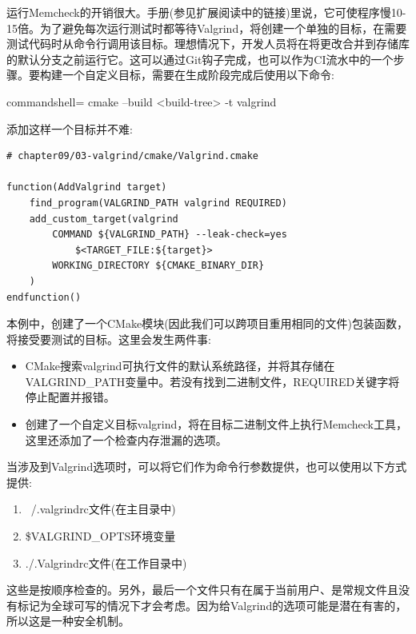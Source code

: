 运行Memcheck的开销很大。手册(参见扩展阅读中的链接)里说，它可使程序慢10-15倍。为了避免每次运行测试时都等待Valgrind，将创建一个单独的目标，在需要测试代码时从命令行调用该目标。理想情况下，开发人员将在将更改合并到存储库的默认分支之前运行它。这可以通过Git钩子完成，也可以作为CI流水中的一个步骤。要构建一个自定义目标，需要在生成阶段完成后使用以下命令:

\begin{tcblisting}{commandshell={}}
cmake --build <build-tree> -t valgrind
\end{tcblisting}

添加这样一个目标并不难:

\begin{lstlisting}[style=styleCMake]
# chapter09/03-valgrind/cmake/Valgrind.cmake

function(AddValgrind target)
	find_program(VALGRIND_PATH valgrind REQUIRED)
	add_custom_target(valgrind
		COMMAND ${VALGRIND_PATH} --leak-check=yes
			$<TARGET_FILE:${target}>
		WORKING_DIRECTORY ${CMAKE_BINARY_DIR}
	)
endfunction()
\end{lstlisting}

本例中，创建了一个CMake模块(因此我们可以跨项目重用相同的文件)包装函数，将接受要测试的目标。这里会发生两件事:

\begin{itemize}
\item 
CMake搜索valgrind可执行文件的默认系统路径，并将其存储在VALGRIND\_PATH变量中。若没有找到二进制文件，REQUIRED关键字将停止配置并报错。

\item 
创建了一个自定义目标valgrind，将在目标二进制文件上执行Memcheck工具，这里还添加了一个检查内存泄漏的选项。
\end{itemize}

当涉及到Valgrind选项时，可以将它们作为命令行参数提供，也可以使用以下方式提供:

\begin{enumerate}
\item 
~/.valgrindrc文件(在主目录中)

\item 
\$VALGRIND\_OPTS环境变量

\item 
./.Valgrindrc文件(在工作目录中)
\end{enumerate}

这些是按顺序检查的。另外，最后一个文件只有在属于当前用户、是常规文件且没有标记为全球可写的情况下才会考虑。因为给Valgrind的选项可能是潜在有害的，所以这是一种安全机制。

